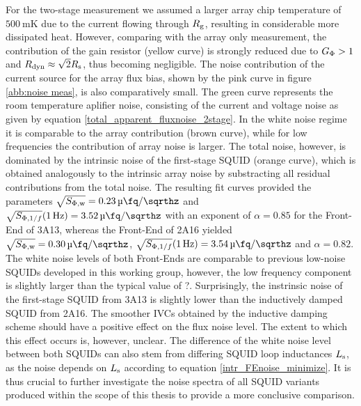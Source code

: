For the two-stage measurement we assumed a larger array chip temperature of $\qty{500}{\milli\kelvin}$ due to the current flowing through $R_{\rm g}$, resulting in considerable more dissipated heat. However, comparing with the array only measurement, the contribution of the gain resistor (yellow curve) is strongly reduced due to $G_{\rm \Phi}>1$ and $R_{\rm dyn}\approx\sqrt{2}R_{\rm s}$, thus becoming negligible. The noise contribution of the current source for the array flux bias, shown by the pink curve in figure \ref{abb:noise meas}, is also comparatively small. The green curve represents the room temperature aplifier noise, consisting of the current and voltage noise as given by equation \ref{total_apparent_fluxnoise_2stage}. In the white noise regime it is comparable to the array contribution (brown curve), while for low frequencies the contribution of array noise is larger. The total noise, however, is dominated by the intrinsic noise of the first-stage SQUID (orange curve), which is obtained analogously to the intrinsic array noise by substracting all residual contributions from the total noise. The resulting fit curves provided the parameters $\sqrt{S_{\rm \Phi,w}}=\qty{0.23}{\micro\fq\per\sqrthz}$ and $\sqrt{S_{{\rm \Phi},1/f}}(\qty{1}{\Hz})=\qty{3.52}{\micro\fq\per\sqrthz}$ with an exponent of $\alpha=0.85$ for the Front-End of 3A13, whereas the Front-End of 2A16 yielded $\sqrt{S_{\rm \Phi,w}}=\qty{0.30}{\micro\fq\per\sqrthz}$, $\sqrt{S_{{\rm \Phi},1/f}}(\qty{1}{\Hz})=\qty{3.54}{\micro\fq\per\sqrthz}$ and $\alpha=0.82$. The white noise levels of both Front-Ends are comparable to previous low-noise SQUIDs developed in this working group, however, the low frequency component is slightly larger than the typical value of ?. Surprisingly, the instrinsic noise of the first-stage SQUID from 3A13 is slightly lower than the inductively damped SQUID from 2A16. The smoother IVCs obtained by the inductive damping scheme should have a positive effect on the flux noise level. The extent to which this effect occurs is, however, unclear. The difference of the white noise level between both SQUIDs can also stem from differing SQUID loop inductances $L_{\rm s}$, as the noise depends on $L_{\rm s}$ according to equation \ref{intr_FEnoise_minimize}. It is thus crucial to further investigate the noise spectra of all SQUID variants produced within the scope of this thesis to provide a more conclusive comparison. \\

